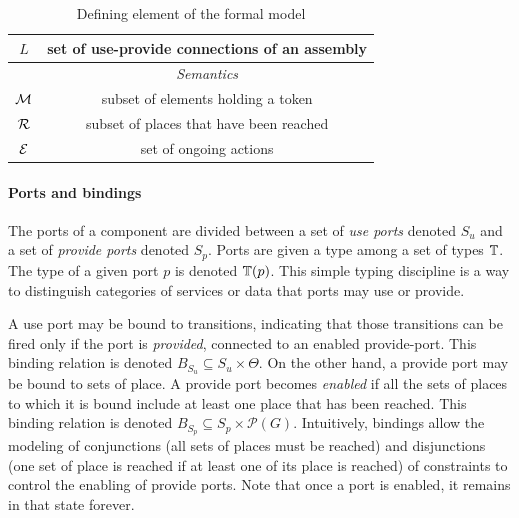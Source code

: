 \begin{table}[tp]
{\begin{tabular}{|c|c|}
      $L$ & set of use-provide connections of an assembly\\
      \hline
      \hline
      & \emph{Semantics}\\
      \hline
      $\mathcal{M}$ & subset of elements holding a token\\
      $\mathcal{R}$ & subset of places that have been reached\\
      $\mathcal{E}$ & set of ongoing actions\\
      \hline
    \end{tabular}
  }
  \caption{Defining element of the \mad formal model}
  \label{tab:not}
\end{table}

\paragraph{Ports and bindings}{

The ports of a component are divided between a set of \emph{use ports}
denoted $S_{u}$ and a set of \emph{provide ports} denoted
$S_{p}$. Ports are given a type among a set of types $\mathbb{T}$. The
type of a given port $p$ is denoted $\mathbb{T}(p)$. This simple typing
discipline is a way to distinguish categories of services or data that
ports may use or provide.

A use port may be bound to transitions, indicating that those
transitions can be fired only if the port is \emph{provided}, \ie
connected to an enabled provide-port. This binding relation is denoted
$B_{S_{u}} \subseteq S_u \times \Theta$. On the other hand, a provide
port may be bound to sets of place. A provide port becomes
\emph{enabled} if all the sets of places to which it is bound include
at least one place that has been reached. This binding relation is
denoted $B_{S_{p}} \subseteq S_p \times \mathcal{P}(G)$. Intuitively,
bindings allow the modeling of conjunctions (all sets of places must
be reached) and disjunctions (one set of place is reached if at least
one of its place is reached) of constraints to control the enabling of
provide ports. Note that once a port is enabled, it remains in that
state forever.



}
